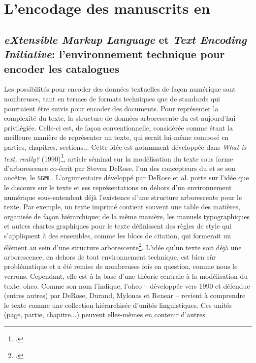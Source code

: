 \section{L'encodage des manuscrits en \xmltei{}}
\subsection{\textit{eXtensible Markup Language} et \textit{Text Encoding Initiative}: l'environnement technique pour encoder les catalogues}
Les possibilités pour encoder des données textuelles de façon numérique sont nombreuses, tant en termes de formats techniques que de standards qui pourraient être suivis pour encoder des documents. Pour représenter la complexité du texte, la structure de données arborescente du \xml{} est aujourd'hui privilégiée. Celle-ci est, de façon conventionnelle, considérée comme étant la meilleure manière de représenter un texte, qui serait lui-même composé en parties, chapitres, sections... Cette idée est notamment développée dans \textit{What is text, really?} (1990)\footcite{derose_what_1990}, article séminal sur la modélisation du texte sous forme d'arborescence co-écrit par Steven DeRose, l'un des concepteurs du \xml{} et se son ancêtre, le \texttt{SGML}. L'argumentaire développé par DeRose et al. porte sur l'idée que le discours sur le texte et ses représentations en dehors d'un environnement numérique sous-entendent déjà l'existence d'une structure arborescente pour le texte. Par exemple, un texte imprimé contient souvent une table des matières, organisée de façon hiérarchique; de la même manière, les manuels typographiques et autres chartes graphiques pour le texte définissent des règles de style qui s'appliquent à des ensembles, comme les blocs de citation, qui formerait un élément au sein d'une structure arborescente\footcite[p. 4]{derose_what_1990}. L'idée qu'un texte soit déjà une arborescence, en dehors de tout environnement technique, est bien sûr problématique et a été remise de nombreuses fois en question, comme nous le verrons. Cependant, elle est à la base d'une théorie centrale à la modélisation du texte: \gls{ohco}. Comme son nom l'indique, l'\gls{ohco} -- développée vers 1990 et défendue (entres autres) par DeRose, Durand, Mylonas et Renear -- revient à comprendre le texte comme une collection hiérarchisée d'unités linguistiques. Ces unités (page, partie, chapitre...) peuvent elles-mêmes en contenir d'autres. 

